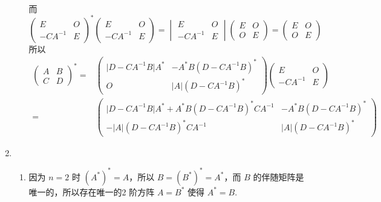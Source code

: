\begin{enumerate}
\begin{enumerate}
\begin{align*}
        \end{align*} 而 \[\begin{pmatrix}
            E & O \\
            -CA^{-1} & E
        \end{pmatrix}^* \begin{pmatrix}
            E & O \\
            -CA^{-1} & E
        \end{pmatrix} = \begin{vmatrix}
            E & O \\
            -CA^{-1} & E
        \end{vmatrix} \begin{pmatrix}
            E & O \\
            O & E
        \end{pmatrix} = \begin{pmatrix}
            E & O \\
            O & E
        \end{pmatrix}\] 所以 \begin{align*}
            \begin{pmatrix}
                A & B \\
                C & D
            \end{pmatrix}^* ={} & \begin{pmatrix}
                \lvert D-CA^{-1}B \rvert A^* & -A^*B(D-CA^{-1}B)^* \\
                O & \lvert A \rvert (D-CA^{-1}B)^*
            \end{pmatrix} \begin{pmatrix}
                E & O \\
                -CA^{-1} & E
            \end{pmatrix} \\ ={} & \begin{pmatrix}
                \lvert D-CA^{-1}B \rvert A^*+A^*B(D-CA^{-1}B)^*CA^{-1} & -A^*B(D-CA^{-1}B)^* \\
                -\lvert A \rvert (D-CA^{-1}B)^*CA^{-1} & \lvert A \rvert (D-CA^{-1}B)^*
            \end{pmatrix}&
        \end{align*}
    \end{enumerate}
    \item \begin{enumerate}
        \item 因为 $n=2$ 时 $(A^*)^* = A$，所以 $B = (B^*)^* = A^*$，而 $B$ 的伴随矩阵是唯一的，所以存在唯一的2 阶方阵 $A = B^*$ 使得 $A^* = B$.

\end{enumerate}
\end{enumerate}
